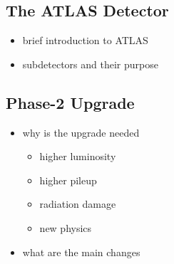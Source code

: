 \subsection{The ATLAS Detector}

\begin{itemize}
    \color{red}
    \item brief introduction to ATLAS
    \item subdetectors and their purpose
\end{itemize}

\subsection{Phase-2 Upgrade}

\begin{itemize}
    \color{red}
    \item why is the upgrade needed
    \begin{itemize}
        \item higher luminosity
        \item higher pileup
        \item radiation damage
        \item new physics
    \end{itemize}
    \item what are the main changes
\end{itemize}
